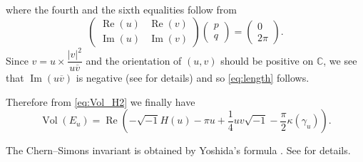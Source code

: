 \documentclass{amsart}
\newcommand{\C}{\mathbb{C}}
\newcommand{\Vol}{\operatorname{Vol}}
\renewcommand{\Re}{\operatorname{Re}}
\renewcommand{\Im}{\operatorname{Im}}
\theoremstyle{definition}
\theoremstyle{remark}
\numberwithin{equation}{section}
\begin{document}
where the fourth and the sixth equalities follow from
\begin{equation*}
  \begin{pmatrix}
    \Re(u)&\Re(v) \\
    \Im(u)&\Im(v)
  \end{pmatrix}
  \begin{pmatrix}
    p\\q
  \end{pmatrix}
  =
  \begin{pmatrix}
    0\\2\pi
  \end{pmatrix}.
\end{equation*}
Since $v=u\times\dfrac{|v|^2}{u\overline{v}}$ and the orientation of $(u,v)$ should be positive on $\C$, we see that $\Im(u\overline{v})$ is negative (see \cite{Neumann/Zagier:TOPOL85} for details) and so \eqref{eq:length} follows.
\par
Therefore from \eqref{eq:Vol_H2} we finally have
\begin{equation*}
  \Vol(E_u)
  =
  \Re
  \left(
    -\sqrt{-1}H(u)
    -\pi u
    +\frac{1}{4}uv\sqrt{-1}
    -\frac{\pi}{2}\kappa(\gamma_u)
  \right).
\end{equation*}
\par
The Chern--Simons invariant is obtained by Yoshida's formula \cite{Yoshida:INVEM85}.
See \cite{Murakami/Yokota:JREIA2007} for details.
\end{document}
